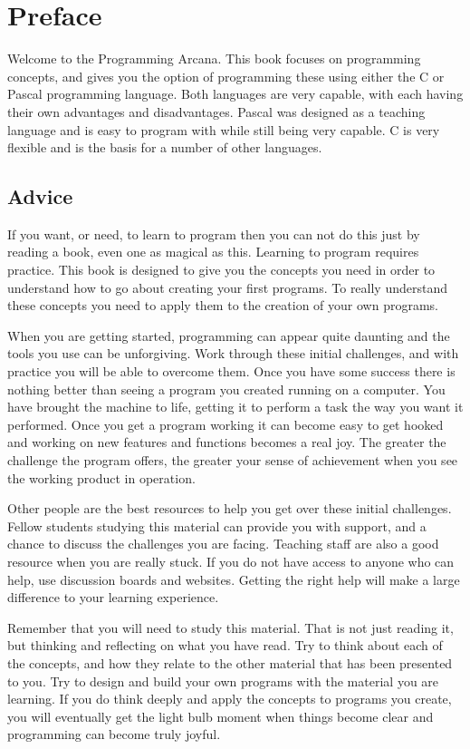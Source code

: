 \chapter*{Preface} %
\label{cha:preface}

Welcome to the Programming Arcana. This book focuses on programming concepts, and gives you the option of programming these using either the C or Pascal programming language. Both languages are very capable, with each having their own advantages and disadvantages. Pascal was designed as a teaching language and is easy to program with while still being very capable. C is very flexible and is the basis for a number of other languages.




\section*{Advice} %
\label{sec:advice}

If you want, or need, to learn to program then you can not do this just by reading a book, even one as magical as this. Learning to program requires practice. This book is designed to give you the concepts you need in order to understand how to go about creating your first programs. To really understand these concepts you need to apply them to the creation of your own programs.

When you are getting started, programming can appear quite daunting and the tools you use can be unforgiving. Work through these initial challenges, and with practice you will be able to overcome them. Once you have some success there is nothing better than seeing a program you created running on a computer. You have brought the machine to life, getting it to perform a task the way you want it performed. Once you get a program working it can become easy to get hooked and working on new features and functions becomes a real joy. The greater the challenge the program offers, the greater your sense of achievement when you see the working product in operation.

Other people are the best resources to help you get over these initial challenges. Fellow students studying this material can provide you with support, and a chance to discuss the challenges you are facing. Teaching staff are also a good resource when you are really stuck. If you do not have access to anyone who can help, use discussion boards and websites. Getting the right help will make a large difference to your learning experience.

Remember that you will need to study this material. That is not just reading it, but thinking and reflecting on what you have read. Try to think about each of the concepts, and how they relate to the other material that has been presented to you. Try to design and build your own programs with the material you are learning. If you do think deeply and apply the concepts to programs you create, you will eventually get the light bulb moment when things become clear and programming can become truly joyful.


